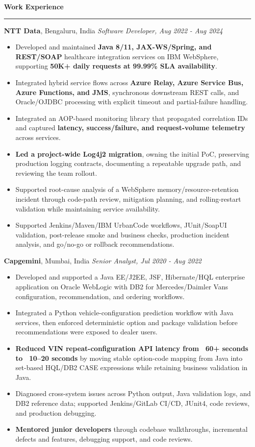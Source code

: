\documentclass[11pt,letterpaper]{article}
\newcommand{\ressection}[1]{\Needspace{6\baselineskip}\vspace{8pt}\par\textbf{#1}\par\vspace{2pt}\hrule\vspace{5pt}}
\begin{document}
\ressection{Work Experience}
\textbf{NTT Data}, Bengaluru, India \hfill \textit{Software Developer, Aug 2022 - Aug 2024}
\begin{itemize}
  \item Developed and maintained \textbf{Java 8/11, JAX-WS/Spring, and REST/SOAP} healthcare integration services on IBM WebSphere, supporting \textbf{50K+ daily requests at 99.99\% SLA availability}.
  \item Integrated hybrid service flows across \textbf{Azure Relay, Azure Service Bus, Azure Functions, and JMS}, synchronous downstream REST calls, and Oracle/OJDBC processing with explicit timeout and partial-failure handling.
  \item Integrated an AOP-based monitoring library that propagated correlation IDs and captured \textbf{latency, success/failure, and request-volume telemetry} across services.
  \item \textbf{Led a project-wide Log4j2 migration}, owning the initial PoC, preserving production logging contracts, documenting a repeatable upgrade path, and reviewing the team rollout.
  \item Supported root-cause analysis of a WebSphere memory/resource-retention incident through code-path review, mitigation planning, and rolling-restart validation while maintaining service availability.
  \item Supported Jenkins/Maven/IBM UrbanCode workflows, JUnit/SoapUI validation, post-release smoke and business checks, production incident analysis, and go/no-go or rollback recommendations.
\end{itemize}
\textbf{Capgemini}, Mumbai, India \hfill \textit{Senior Analyst, Jul 2020 - Aug 2022}
\begin{itemize}
  \item Developed and supported a Java EE/J2EE, JSF, Hibernate/HQL enterprise application on Oracle WebLogic with DB2 for Mercedes/Daimler Vans configuration, recommendation, and ordering workflows.
  \item Integrated a Python vehicle-configuration prediction workflow with Java services, then enforced deterministic option and package validation before recommendations were exposed to dealer users.
  \item \textbf{Reduced VIN repeat-configuration API latency from ~60+ seconds to ~10--20 seconds} by moving stable option-code mapping from Java into set-based HQL/DB2 CASE expressions while retaining business validation in Java.
  \item Diagnosed cross-system issues across Python output, Java validation logs, and DB2 reference data; supported Jenkins/GitLab CI/CD, JUnit4, code reviews, and production debugging.
  \item \textbf{Mentored junior developers} through codebase walkthroughs, incremental defects and features, debugging support, and code reviews.
\end{itemize}
\end{document}
